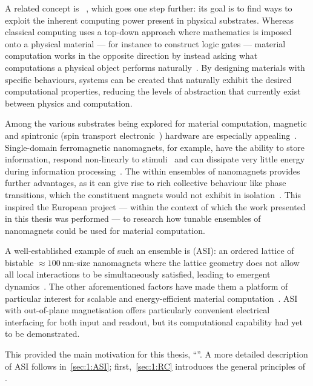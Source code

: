A related concept is ~\cite{NeglectedPillar}, which goes one step further: its goal is to find ways to exploit the inherent computing power present in physical substrates.
Whereas classical computing uses a top-down approach where mathematics is imposed onto a physical material --- for instance to construct logic gates --- material computation works in the opposite direction by instead asking what computations a physical object performs naturally~\cite{RC_ASI}.
By designing materials with specific behaviours, systems can be created that naturally exhibit the desired computational properties, reducing the levels of abstraction that currently exist between physics and computation. \par
Among the various substrates being explored for material computation, magnetic and spintronic (spin transport electronic~\cite{Spintronics}) hardware are especially appealing~\cite{grollier2020neuromorphic,NeuromorphicSpintronicsProspect,QuantumNeuromorphicOpportunities}.
Single-domain ferromagnetic nanomagnets, for example, have the ability to store information, respond non-linearly to stimuli~\cite{NeuromorphicSpintronics} and can dissipate very little energy during information processing~\cite{ThermodynamicLimitsComputation,SpintronicsEnergyEfficientComputing}.
The  within ensembles of nanomagnets provides further advantages, as it can give rise to rich collective behaviour like phase transitions, which the constituent magnets would not exhibit in isolation~\cite{NeuromorphicSpintronicsProspect,RC_ASI}.
This inspired the European \spinengine project --- within the context of which the work presented in this thesis was performed --- to research how tunable ensembles of nanomagnets could be used for material computation. \par %
A well-established example of such an ensemble is  (ASI): an ordered lattice of bistable $\approx \SI{100}{\nano\metre}$-size nanomagnets where the lattice geometry does not allow all local interactions to be simultaneously satisfied, leading to emergent dynamics~\cite{ASIpyrochlores}.
The other aforementioned factors have made them a platform of particular interest for scalable and energy-efficient material computation~\cite{PhD_Stromberg}.
ASI with out-of-plane magnetisation offers particularly convenient electrical interfacing for both input and readout, but its computational capability had yet to be demonstrated. \par %
This provided the main motivation for this thesis, ``\!\emph{\phdtitle}''.
A more detailed description of ASI follows in~\cref{sec:1:ASI}; first,~\cref{sec:1:RC} introduces the general principles of .

